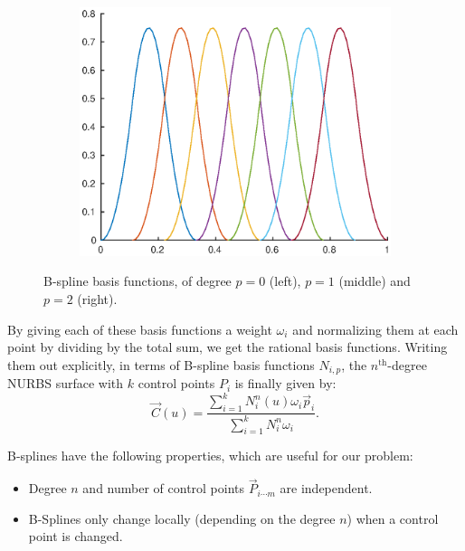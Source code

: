 \begin{figure}
\begin{subfigure}[b]{.3\linewidth}
  \includegraphics[width=\linewidth]{Pictures/basisquadratic}
  \label{fig:lognorm_quadratic}
\end{subfigure}
\caption{B-spline basis functions, of degree $p=0$ (left), $p=1$ (middle) and $p=2$ (right).}
\label{fig:bsplineBases}
\end{figure}


By giving each of these basis functions a weight $\omega_i$ and normalizing them at each point by dividing by the total sum, we get the rational basis functions. Writing them out explicitly, in terms of B-spline basis functions $N_{i,p}$, the $n^{\text{th}}$-degree NURBS surface with $k$ control points $P_i$ is finally given by:
\begin{equation}
\label{eq:nurbscurve}
\vec{C}(u) = \frac{\sum_{i=1}^{k}N_i^n\left(u\right)\omega_{i}\vec{p}_{i}}{\sum_{i=1}^{k}N_i^n\omega_{i}}.
\end{equation}

B-splines have the following properties, which are useful for our problem:
\begin{itemize}
\item Degree $n$ and number of control points $\vec{P}_{i\cdots m}$ are independent.
\item B-Splines only change locally (depending on the degree $n$) when a control point is changed.
\end{itemize}

